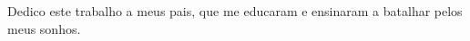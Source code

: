 \begin{dedicatoria}
	
	 Dedico este trabalho a meus pais, que me educaram e ensinaram a batalhar pelos meus sonhos.  

\end{dedicatoria}
